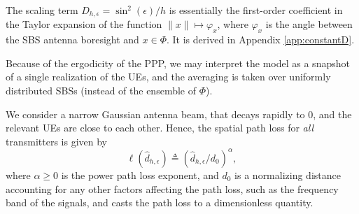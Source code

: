 \documentclass[lettersize,journal]{IEEEtran}
\begin{document}
The scaling term $D_{h,\epsilon} = \sin^2(\epsilon)/h$ is essentially the first-order coefficient in the Taylor expansion of the function $\|x\| \mapsto \varphi_x$, where $\varphi_x$ is the angle between the SBS antenna boresight and  $x \in \Phi$. It is derived in Appendix \ref{app:constantD}.

Because of the ergodicity of the PPP, we may interpret the model as a snapshot of a single realization of the UEs, and the averaging is taken over uniformly distributed SBSs (instead of the ensemble of $\Phi$).

We consider a narrow Gaussian antenna beam, that decays rapidly to $0$, and the relevant UEs are close to each other. Hence, the spatial path loss for \textit{all} transmitters is given by
\begin{equation}
  \ell(\hat{d}_{h,\epsilon}) \triangleq  {(\hat{d}_{h,\epsilon}/d_0)}^{\alpha},
\end{equation}
where $\alpha \geq 0$ is the power path loss exponent, and $d_0$ is a normalizing distance accounting for any other factors affecting the path loss, such as the frequency band of the signals, and casts the path loss to a dimensionless quantity.
\end{document}

